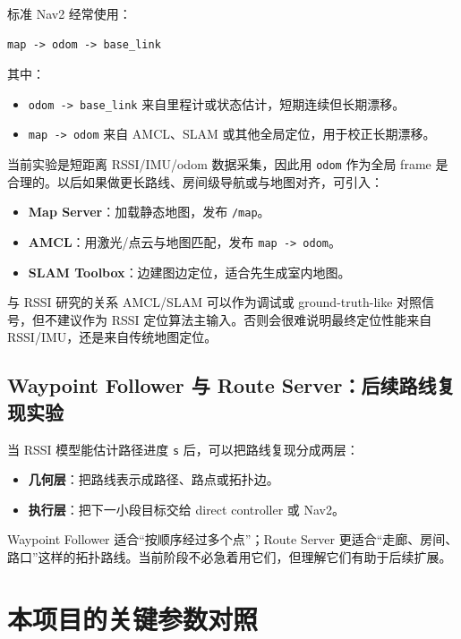 \documentclass[UTF8,11pt,a4paper,openany]{ctexrep}
\newcommand{\code}[1]{\nolinkurl{#1}}
\newcommand{\topic}[1]{\nolinkurl{#1}}
\begin{document}
标准 Nav2 经常使用：

\begin{lstlisting}
map -> odom -> base_link
\end{lstlisting}

其中：

\begin{itemize}
  \item \topic{odom -> base_link} 来自里程计或状态估计，短期连续但长期漂移。
  \item \topic{map -> odom} 来自 AMCL、SLAM 或其他全局定位，用于校正长期漂移。
\end{itemize}

当前实验是短距离 RSSI/IMU/odom 数据采集，因此用 \code{odom} 作为全局 frame 是合理的。以后如果做更长路线、房间级导航或与地图对齐，可引入：

\begin{itemize}
  \item \textbf{Map Server}：加载静态地图，发布 \topic{/map}。
  \item \textbf{AMCL}：用激光/点云与地图匹配，发布 \topic{map -> odom}。
  \item \textbf{SLAM Toolbox}：边建图边定位，适合先生成室内地图。
\end{itemize}

\begin{notebox}{与 RSSI 研究的关系}
AMCL/SLAM 可以作为调试或 ground-truth-like 对照信号，但不建议作为 RSSI 定位算法主输入。否则会很难说明最终定位性能来自 RSSI/IMU，还是来自传统地图定位。
\end{notebox}

\section{Waypoint Follower 与 Route Server：后续路线复现实验}

当 RSSI 模型能估计路径进度 \code{s} 后，可以把路线复现分成两层：

\begin{itemize}
  \item \textbf{几何层}：把路线表示成路径、路点或拓扑边。
  \item \textbf{执行层}：把下一小段目标交给 direct controller 或 Nav2。
\end{itemize}

Waypoint Follower 适合“按顺序经过多个点”；Route Server 更适合“走廊、房间、路口”这样的拓扑路线。当前阶段不必急着用它们，但理解它们有助于后续扩展。

\chapter{本项目的关键参数对照}
\label{chap:params}
\end{document}
